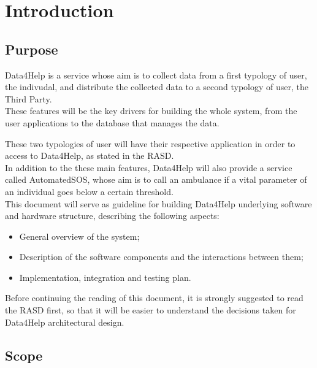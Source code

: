 
\chapter{Introduction} \label{c:intro}

\section{Purpose}
Data4Help is a service whose aim is to collect data from a first typology of user, the indivudal, and distribute the collected data to a second typology of user, the Third Party.\\
These features will be the key drivers for building the whole system, from the user applications to the database that manages the data.

These two typologies of user will have their respective application in order to access to Data4Help, as stated in the RASD. 
\\
In addition to the these main features, Data4Help will also provide a service called AutomatedSOS, whose aim is to call an ambulance if a vital parameter of an individual goes below a certain threshold.
\\
This document will serve as guideline for building Data4Help underlying software and hardware structure, describing the following aspects:
\begin{itemize}
\item General overview of the system;
\item Description of the software components and the interactions between them;
\item Implementation, integration and testing plan.
\end{itemize}

Before continuing the reading of this document, it is strongly suggested to read the RASD first, so that it will be easier to understand the decisions taken for Data4Help architectural design.


\section{Scope}

